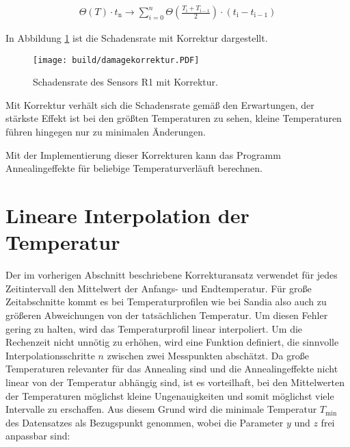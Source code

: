 \begin{align}
  \Theta(T) \cdot t_{\mathrm{n}} \rightarrow \sum_{i=0}^n   \Theta \left(\frac{T_{\mathrm{i}} +T_{\mathrm{i-1}}}{2}\right) \cdot  (t_{\mathrm{i}} - t_{\mathrm{i-1}})
\end{align}

In Abbildung \ref{fig:korrektur_damage} ist die Schadensrate mit Korrektur
dargestellt.

\begin{figure}
  \centering
    \texttt{[image: build/damagekorrektur.PDF]}
\caption{Schadensrate des Sensors R1 mit Korrektur.}
\label{fig:korrektur_damage}
\end{figure}


Mit Korrektur verhält sich die Schadensrate gemäß den Erwartungen, der stärkste
Effekt ist bei den größten Temperaturen zu sehen, kleine Temperaturen führen hingegen
nur zu minimalen Änderungen.

Mit der Implementierung dieser Korrekturen kann das Programm Annealingeffekte für
beliebige Temperaturverläuft berechnen.



\section{Lineare Interpolation der Temperatur}
Der im vorherigen Abschnitt beschriebene Korrekturansatz verwendet für jedes
Zeitintervall den Mittelwert der Anfangs- und Endtemperatur. Für große
Zeitabschnitte kommt es bei Temperaturprofilen wie bei Sandia also auch zu größeren Abweichungen von der tatsächlichen
Temperatur. Um diesen Fehler gering zu halten, wird das Temperaturprofil
linear interpoliert.
Um die Rechenzeit nicht unnötig zu erhöhen, wird eine Funktion definiert, die sinnvolle
Interpolationsschritte $n$ zwischen zwei Messpunkten abschätzt.
Da große Temperaturen relevanter für das Annealing sind und die Annealingeffekte nicht linear von
der Temperatur abhängig sind, ist es vorteilhaft,
bei den Mittelwerten der Temperaturen möglichst kleine Ungenauigkeiten und somit möglichst viele
Intervalle zu erschaffen. Aus diesem Grund wird die minimale Temperatur $T_{\mathrm{min}}$ des Datensatzes
als Bezugspunkt genommen, wobei die Parameter $y$ und $z$ frei anpassbar sind:


